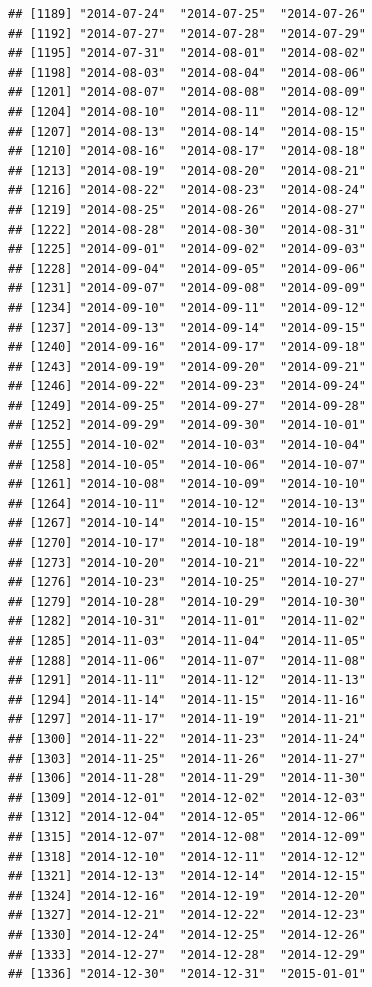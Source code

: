 \documentclass[10pt]{article}\usepackage[]{graphicx}\usepackage[]{color}
\makeatletter
\newenvironment{kframe}{%
 \def\at@end@of@kframe{}%
 \ifinner\ifhmode%
  \def\at@end@of@kframe{\end{minipage}}%
  \begin{minipage}{\columnwidth}%
 \fi\fi%
 \def\FrameCommand##1{\hskip\@totalleftmargin \hskip-\fboxsep
 \colorbox{shadecolor}{##1}\hskip-\fboxsep
     \hskip-\linewidth \hskip-\@totalleftmargin \hskip\columnwidth}%
 \MakeFramed {\advance\hsize-\width
   \@totalleftmargin\z@ \linewidth\hsize
   \@setminipage}}%
 {\par\unskip\endMakeFramed%
 \at@end@of@kframe}
\newenvironment{knitrout}{}{} %
\theoremstyle{plain}
\makeatother
\begin{document}
\begin{knitrout}
\begin{kframe}
\begin{verbatim}
## [1189] "2014-07-24"  "2014-07-25"  "2014-07-26" 
## [1192] "2014-07-27"  "2014-07-28"  "2014-07-29" 
## [1195] "2014-07-31"  "2014-08-01"  "2014-08-02" 
## [1198] "2014-08-03"  "2014-08-04"  "2014-08-06" 
## [1201] "2014-08-07"  "2014-08-08"  "2014-08-09" 
## [1204] "2014-08-10"  "2014-08-11"  "2014-08-12" 
## [1207] "2014-08-13"  "2014-08-14"  "2014-08-15" 
## [1210] "2014-08-16"  "2014-08-17"  "2014-08-18" 
## [1213] "2014-08-19"  "2014-08-20"  "2014-08-21" 
## [1216] "2014-08-22"  "2014-08-23"  "2014-08-24" 
## [1219] "2014-08-25"  "2014-08-26"  "2014-08-27" 
## [1222] "2014-08-28"  "2014-08-30"  "2014-08-31" 
## [1225] "2014-09-01"  "2014-09-02"  "2014-09-03" 
## [1228] "2014-09-04"  "2014-09-05"  "2014-09-06" 
## [1231] "2014-09-07"  "2014-09-08"  "2014-09-09" 
## [1234] "2014-09-10"  "2014-09-11"  "2014-09-12" 
## [1237] "2014-09-13"  "2014-09-14"  "2014-09-15" 
## [1240] "2014-09-16"  "2014-09-17"  "2014-09-18" 
## [1243] "2014-09-19"  "2014-09-20"  "2014-09-21" 
## [1246] "2014-09-22"  "2014-09-23"  "2014-09-24" 
## [1249] "2014-09-25"  "2014-09-27"  "2014-09-28" 
## [1252] "2014-09-29"  "2014-09-30"  "2014-10-01" 
## [1255] "2014-10-02"  "2014-10-03"  "2014-10-04" 
## [1258] "2014-10-05"  "2014-10-06"  "2014-10-07" 
## [1261] "2014-10-08"  "2014-10-09"  "2014-10-10" 
## [1264] "2014-10-11"  "2014-10-12"  "2014-10-13" 
## [1267] "2014-10-14"  "2014-10-15"  "2014-10-16" 
## [1270] "2014-10-17"  "2014-10-18"  "2014-10-19" 
## [1273] "2014-10-20"  "2014-10-21"  "2014-10-22" 
## [1276] "2014-10-23"  "2014-10-25"  "2014-10-27" 
## [1279] "2014-10-28"  "2014-10-29"  "2014-10-30" 
## [1282] "2014-10-31"  "2014-11-01"  "2014-11-02" 
## [1285] "2014-11-03"  "2014-11-04"  "2014-11-05" 
## [1288] "2014-11-06"  "2014-11-07"  "2014-11-08" 
## [1291] "2014-11-11"  "2014-11-12"  "2014-11-13" 
## [1294] "2014-11-14"  "2014-11-15"  "2014-11-16" 
## [1297] "2014-11-17"  "2014-11-19"  "2014-11-21" 
## [1300] "2014-11-22"  "2014-11-23"  "2014-11-24" 
## [1303] "2014-11-25"  "2014-11-26"  "2014-11-27" 
## [1306] "2014-11-28"  "2014-11-29"  "2014-11-30" 
## [1309] "2014-12-01"  "2014-12-02"  "2014-12-03" 
## [1312] "2014-12-04"  "2014-12-05"  "2014-12-06" 
## [1315] "2014-12-07"  "2014-12-08"  "2014-12-09" 
## [1318] "2014-12-10"  "2014-12-11"  "2014-12-12" 
## [1321] "2014-12-13"  "2014-12-14"  "2014-12-15" 
## [1324] "2014-12-16"  "2014-12-19"  "2014-12-20" 
## [1327] "2014-12-21"  "2014-12-22"  "2014-12-23" 
## [1330] "2014-12-24"  "2014-12-25"  "2014-12-26" 
## [1333] "2014-12-27"  "2014-12-28"  "2014-12-29" 
## [1336] "2014-12-30"  "2014-12-31"  "2015-01-01" 

\end{verbatim}
\end{kframe}
\end{knitrout}
\end{document}
